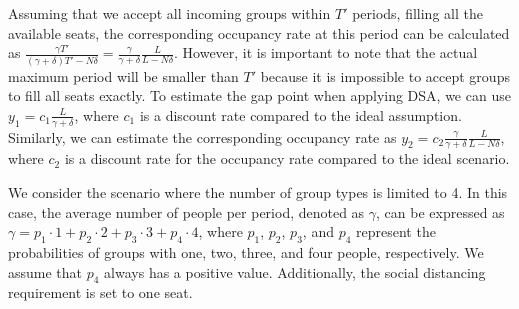 
Assuming that we accept all incoming groups within $T'$ periods, filling all the available seats, the corresponding occupancy rate at this period can be calculated as $\frac{\gamma T'}{(\gamma+ \delta)T' - N \delta} = \frac{\gamma}{\gamma +\delta} \frac{L}{L-N \delta}$. However, it is important to note that the actual maximum period will be smaller than $T{'}$ because it is impossible to accept groups to fill all seats exactly. To estimate the gap point when applying DSA, we can use $y_1 = c_1 \frac{L}{\gamma + \delta}$, where $c_1$ is a discount rate compared to the ideal assumption. Similarly, we can estimate the corresponding occupancy rate as $y_2 = c_2 \frac{\gamma}{\gamma +\delta} \frac{L}{L-N \delta}$, where $c_2$ is a discount rate for the occupancy rate compared to the ideal scenario.




We consider the scenario where the number of group types is limited to 4. In this case, the average number of people per period, denoted as $\gamma$, can be expressed as $\gamma = p_1 \cdot 1 + p_2 \cdot 2 + p_3 \cdot 3 + p_4 \cdot 4$, where $p_1$, $p_2$, $p_3$, and $p_4$ represent the probabilities of groups with one, two, three, and four people, respectively. We assume that $p_4$ always has a positive value. Additionally, the social distancing requirement is set to one seat.

